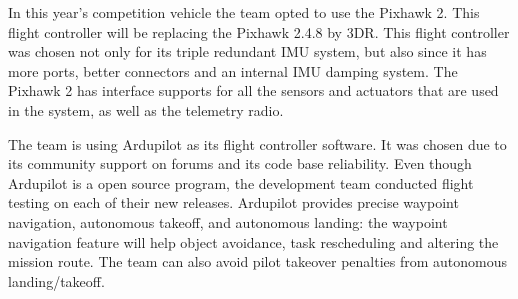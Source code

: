 
In this year's competition vehicle the team opted to use the Pixhawk 2. This flight controller will be replacing the Pixhawk 2.4.8 by 3DR. This flight controller was chosen not only for its triple redundant IMU system, but also since it has more ports, better connectors and an internal IMU damping system. The Pixhawk 2 has interface supports for all the sensors and actuators that are used in the system, as well as the telemetry radio. 

The team is using Ardupilot as its flight controller software. It was chosen due to its community support on forums and its code base reliability. Even though Ardupilot is a open source program, the development team conducted flight testing on each of their new releases. Ardupilot provides precise waypoint navigation, autonomous takeoff, and autonomous landing: the waypoint navigation feature will help object avoidance, task rescheduling and altering the mission route. The team can also avoid pilot takeover penalties from autonomous landing/takeoff.

\endinput